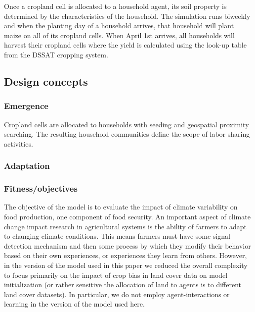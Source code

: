 \documentclass[12pt, titlepage]{article}
\begin{document}
Once a cropland cell is allocated to a household agent, its soil property is determined by the characteristics of the household. The simulation runs biweekly and when the planting day of a household arrives, that household will plant maize on all of its cropland cells. When April 1st arrives, all households will harvest their cropland cells where the yield is calculated using the look-up table from the DSSAT cropping system.

\subsection{\large Design concepts}

\subsubsection{Emergence} 
Cropland cells are allocated to households with seeding and geospatial proximity searching. The resulting household communities define the scope of labor sharing activities.

\subsubsection{Adaptation}
% 
\subsubsection{Fitness/objectives} 
The objective of the model is to evaluate the impact of climate variability on food production, one component of food security. An important aspect of climate change impact research in agricultural systems is the ability of farmers to adapt to changing climate conditions. This means farmers must have some signal detection mechanism and then some process by which they modify their behavior based on their own experiences, or experiences they learn from others. However, in the version of the model used in this paper we reduced the overall complexity to focus primarily on the impact of crop bias in land cover data on model initialization (or rather sensitive the allocation of land to agents is to different land cover datasets). In particular, we do not employ agent-interactions or learning in the version of the model used here.  
\end{document}
